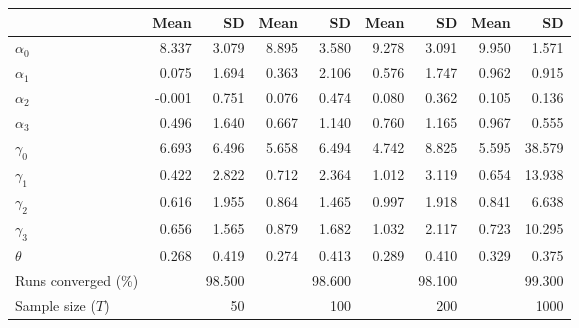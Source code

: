 
\begin{tabular}[t]{lrrrrrrrr}
\toprule
  & Mean & SD & Mean  & SD  & Mean   & SD   & Mean    & SD   \\
\midrule
$\alpha_{0}$ & 8.337 & 3.079 & 8.895 & 3.580 & 9.278 & 3.091 & 9.950 & 1.571\\
$\alpha_{1}$ & 0.075 & 1.694 & 0.363 & 2.106 & 0.576 & 1.747 & 0.962 & 0.915\\
$\alpha_{2}$ & -0.001 & 0.751 & 0.076 & 0.474 & 0.080 & 0.362 & 0.105 & 0.136\\
$\alpha_{3}$ & 0.496 & 1.640 & 0.667 & 1.140 & 0.760 & 1.165 & 0.967 & 0.555\\
$\gamma_{0}$ & 6.693 & 6.496 & 5.658 & 6.494 & 4.742 & 8.825 & 5.595 & 38.579\\
$\gamma_{1}$ & 0.422 & 2.822 & 0.712 & 2.364 & 1.012 & 3.119 & 0.654 & 13.938\\
$\gamma_{2}$ & 0.616 & 1.955 & 0.864 & 1.465 & 0.997 & 1.918 & 0.841 & 6.638\\
$\gamma_{3}$ & 0.656 & 1.565 & 0.879 & 1.682 & 1.032 & 2.117 & 0.723 & 10.295\\
$\theta$ & 0.268 & 0.419 & 0.274 & 0.413 & 0.289 & 0.410 & 0.329 & 0.375\\
Runs converged (\%) &  & 98.500 &  & 98.600 &  & 98.100 &  & 99.300\\
Sample size ($T$) &  & 50 &  & 100 &  & 200 &  & 1000\\
\bottomrule
\end{tabular}
